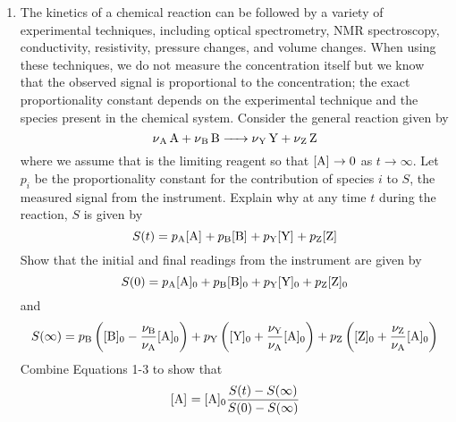\documentclass[../psets.tex]{subfiles}
\begin{document}
\begin{enumerate}[label={\textbf{28-\arabic*.}},leftmargin=3.5em]
\begin{proof}[Answer]
\begin{align*}
            A &= \frac{\e\kB T}{h}\e[\Delta^\ddagger S^\circ/R]\\
            \Delta^\ddagger S^\circ &= R\ln\frac{Ah}{\e\kB T}\\
            \Aboxed{\Delta^\ddagger S^\circ &= \SI[per-mode=fraction,fraction-function=\tfrac]{-32.1}{\joule\per\mole\per\kelvin}}
        \end{align*}
        at \SI{420}{\kelvin}.
    \end{proof}
    \item The kinetics of a chemical reaction can be followed by a variety of experimental techniques, including optical spectrometry, NMR spectroscopy, conductivity, resistivity, pressure changes, and volume changes. When using these techniques, we do not measure the concentration itself but we know that the observed signal is proportional to the concentration; the exact proportionality constant depends on the experimental technique and the species present in the chemical system. Consider the general reaction given by
    \begin{equation*}
        \ce{\nu_{\ce{A}} A + \nu_{\ce{B}} B -> \nu_{\ce{Y}} Y + \nu_{\ce{Z}} Z}
    \end{equation*}
    where we assume that  is the limiting reagent so that $\cnc{A}\to 0$ as $t\to\infty$. Let $p_i$ be the proportionality constant for the contribution of species $i$ to $S$, the measured signal from the instrument. Explain why at any time $t$ during the reaction, $S$ is given by
    \begin{equation}
        S(t) = p_{\ce{A}}\cnc{A}+p_{\ce{B}}\cnc{B}+p_{\ce{Y}}\cnc{Y}+p_{\ce{Z}}\cnc{Z}
    \end{equation}
    Show that the initial and final readings from the instrument are given by
    \begin{equation}
        S(0) = p_{\ce{A}}\cnc[0]{A}+p_{\ce{B}}\cnc[0]{B}+p_{\ce{Y}}\cnc[0]{Y}+p_{\ce{Z}}\cnc[0]{Z}
    \end{equation}
    and
    \begin{equation}
        S(\infty) = p_{\ce{B}}\left( \cnc[0]{B}-\frac{\nu_{\ce{B}}}{\nu_{\ce{A}}}\cnc[0]{A} \right)+p_{\ce{Y}}\left( \cnc[0]{Y}+\frac{\nu_{\ce{Y}}}{\nu_{\ce{A}}}\cnc[0]{A} \right)+p_{\ce{Z}}\left( \cnc[0]{Z}+\frac{\nu_{\ce{Z}}}{\nu_{\ce{A}}}\cnc[0]{A} \right)
    \end{equation}
    Combine Equations 1-3 to show that
    \begin{equation*}
        \cnc{A} = \cnc[0]{A}\frac{S(t)-S(\infty)}{S(0)-S(\infty)}

\end{equation*}
\end{enumerate}
\end{document}
